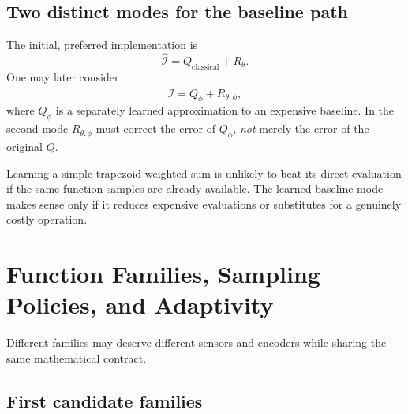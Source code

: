 \subsection{Two distinct modes for the baseline path}

The initial, preferred implementation is
\begin{equation}
    \widehat{\mathcal I}=Q_{\mathrm{classical}}+R_\theta.
    \label{eq:resop-classical-mode}
\end{equation}
One may later consider
\begin{equation}
    \widehat{\mathcal I}=Q_\phi+R_{\theta,\phi},
    \label{eq:resop-learned-mode}
\end{equation}
where $Q_\phi$ is a separately learned approximation to an expensive
baseline. In the second mode $R_{\theta,\phi}$ must correct the error of
$Q_\phi$, \emph{not} merely the error of the original $Q$.

Learning a simple trapezoid weighted sum is unlikely to beat its direct
evaluation if the same function samples are already available. The
learned-baseline mode makes sense only if it reduces expensive evaluations
or substitutes for a genuinely costly operation.

\section{Function Families, Sampling Policies, and Adaptivity}
\label{sec:resop-families}

Different families may deserve different sensors and encoders while
sharing the same mathematical contract.

\subsection{First candidate families}

